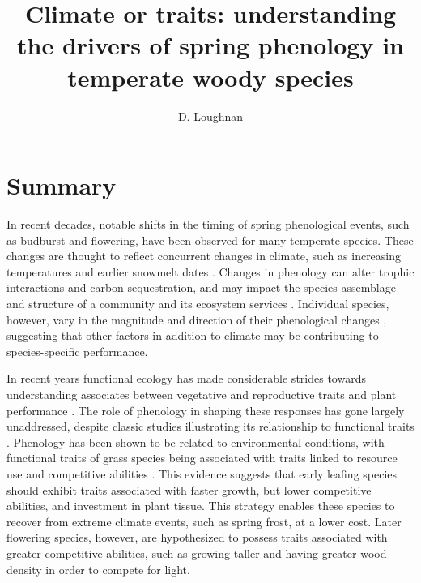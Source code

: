 \documentclass[11pt,a4paper,oneside]{article}
\title{Climate or traits: understanding the drivers of spring phenology in temperate woody species}
\author{D. Loughnan}
\begin{document}
\maketitle
 
\section*{Summary}
\par In recent decades, notable shifts in the timing of spring phenological events, such as budburst and flowering, have been observed for many temperate species. These changes are thought to reflect concurrent changes in climate, such as increasing temperatures and earlier snowmelt dates \cite{ Anderson2012}. Changes in phenology can alter trophic interactions and carbon sequestration, and may impact the species assemblage and structure of a community and its ecosystem services \cite{Kharouba2018, Cleland:2007}. Individual species, however, vary in the magnitude and direction of their phenological changes \cite{Fitter2002,Dunnell2011, Konig2018}, suggesting that other factors in addition to climate may be contributing to species-specific performance.

\par In recent years functional ecology has made considerable strides towards understanding associates between vegetative and reproductive traits and plant performance \cite{McGill2006}.  The role of phenology in shaping these responses has gone largely unaddressed, despite classic studies illustrating its relationship to functional traits \cite{Lechowich1984}. Phenology has been shown to be related to environmental conditions, with functional traits of grass species being associated with traits linked to resource use and competitive abilities \cite{Konig2018; SunFrelich2011}. This evidence suggests that early leafing species should exhibit traits associated with faster growth, but lower competitive abilities, and investment in plant tissue. This strategy enables these species to recover from extreme climate events, such as spring frost, at a lower cost. Later flowering species, however, are hypothesized to possess traits associated with greater competitive abilities, such as growing taller and having greater wood density in order to compete for light. 
\end{document}
